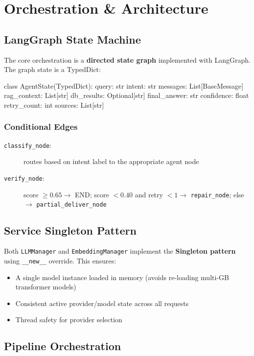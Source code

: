 \documentclass[12pt, a4paper, oneside]{report}
\newcommand{\kw}[1]{\texttt{\small #1}}
\begin{document}
\chapter{Orchestration \& Architecture}

\section{LangGraph State Machine}

The core orchestration is a \textbf{directed state graph} implemented with LangGraph.
The graph state is a TypedDict:

\begin{codebox}
class AgentState(TypedDict):
    query: str
    intent: str
    messages: List[BaseMessage]
    rag_context: List[str]
    db_results: Optional[str]
    final_answer: str
    confidence: float
    retry_count: int
    sources: List[str]
\end{codebox}

\subsection*{Conditional Edges}
\begin{description}
  \item[\kw{classify\_node}:] routes based on intent label to the appropriate agent node
  \item[\kw{verify\_node}:] score $\geq 0.65 \to$ END; score $< 0.40$ and retry $< 1 \to$ \kw{repair\_node}; else $\to$ \kw{partial\_deliver\_node}
\end{description}

\section{Service Singleton Pattern}

Both \kw{LLMManager} and \kw{EmbeddingManager} implement the \textbf{Singleton pattern}
using \kw{\_\_new\_\_} override. This ensures:
\begin{itemize}
  \item A single model instance loaded in memory (avoids re-loading multi-GB transformer models)
  \item Consistent active provider/model state across all requests
  \item Thread safety for provider selection
\end{itemize}

\section{Pipeline Orchestration}
\end{document}
